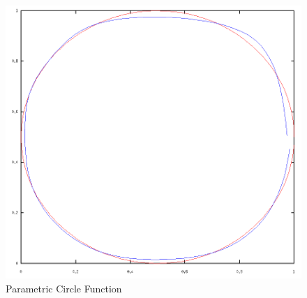 \documentclass{article}
\begin{document}
\begin{figure}[tb]
	\begin{center}
		\includegraphics[scale=0.5]{img/circle}
	\end{center}
	\caption{Parametric Circle Function}
	\label{fig:circle}
\end{figure}
\end{document}
